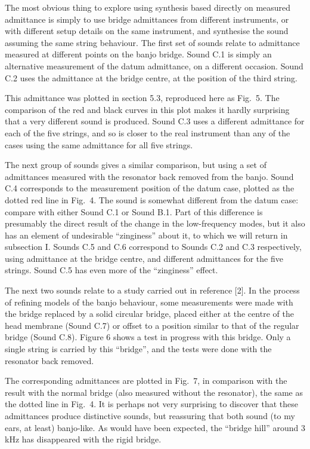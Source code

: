   The most obvious thing to explore using synthesis based directly on measured 
  admittance is simply to use bridge admittances from different instruments, or 
  with different setup details on the same instrument, and synthesise the sound 
  assuming the same string behaviour. The first set of sounds relate to 
  admittance measured at different points on the banjo bridge. Sound C.1 is 
  simply an alternative measurement of the datum admittance, on a different 
  occasion. Sound C.2 uses the admittance at the bridge centre, at the position 
  of the third string. 

  This admittance was plotted in section 5.3, reproduced here as Fig.\ 5. The 
  comparison of the red and black curves in this plot makes it hardly 
  surprising that a very different sound is produced. Sound C.3 uses a 
  different admittance for each of the five strings, and so is closer to the 
  real instrument than any of the cases using the same admittance for all five 
  strings. 

  The next group of sounds gives a similar comparison, but using a set of 
  admittances measured with the resonator back removed from the banjo. Sound 
  C.4 corresponds to the measurement position of the datum case, plotted as the 
  dotted red line in Fig.\ 4. The sound is somewhat different from the datum 
  case: compare with either Sound C.1 or Sound B.1. Part of this difference is 
  presumably the direct result of the change in the low-frequency modes, but it 
  also has an element of undesirable ``zinginess'' about it, to which we will 
  return in subsection I. Sounds C.5 and C.6 correspond to Sounds C.2 and C.3 
  respectively, using admittance at the bridge centre, and different 
  admittances for the five strings. Sound C.5 has even more of the 
  ``zinginess'' effect. 

  The next two sounds relate to a study carried out in reference [2]. In the 
  process of refining models of the banjo behaviour, some measurements were 
  made with the bridge replaced by a solid circular bridge, placed either at 
  the centre of the head membrane (Sound C.7) or offset to a position similar 
  to that of the regular bridge (Sound C.8). Figure 6 shows a test in progress 
  with this bridge. Only a single string is carried by this ``bridge'', and the 
  tests were done with the resonator back removed. 

  The corresponding admittances are plotted in Fig.\ 7, in comparison with the 
  result with the normal bridge (also measured without the resonator), the same 
  as the dotted line in Fig.\ 4. It is perhaps not very surprising to discover 
  that these admittances produce distinctive sounds, but reassuring that both 
  sound (to my ears, at least) banjo-like. As would have been expected, the 
  ``bridge hill'' around 3 kHz has disappeared with the rigid bridge. 

